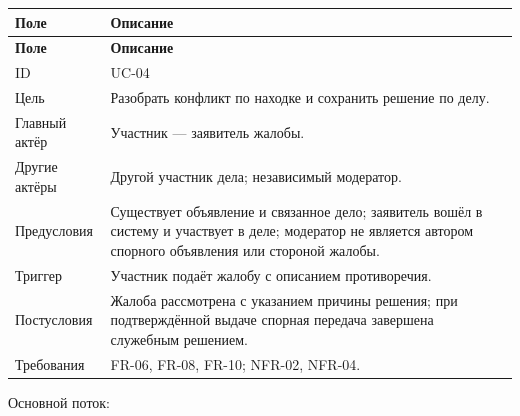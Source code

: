 \begingroup
{}
\fontsize{12}{14}\selectfont
\setlength{\tablecontentwidth}{\dimexpr\linewidth-4\tabcolsep-3\arrayrulewidth\relax}
\begin{longtable}{|>{\RaggedRight\arraybackslash}p{0.25\tablecontentwidth}|>{\RaggedRight\arraybackslash}p{0.75\tablecontentwidth}|}
\hline
\textbf{Поле} & \textbf{Описание} \\ \hline
\endfirsthead
\textbf{Поле} & \textbf{Описание} \\ \hline
\endhead
\endfoot
\endlastfoot
ID & UC-04 \\ \hline
Цель & Разобрать конфликт по находке и сохранить решение по делу. \\ \hline
Главный актёр & Участник — заявитель жалобы. \\ \hline
Другие актёры & Другой участник дела; независимый модератор. \\ \hline
Предусловия & Существует объявление и связанное дело; заявитель вошёл в систему и участвует в деле; модератор не является автором спорного объявления или стороной жалобы. \\ \hline
Триггер & Участник подаёт жалобу с описанием противоречия. \\ \hline
Постусловия & Жалоба рассмотрена с указанием причины решения; при подтверждённой выдаче спорная передача завершена служебным решением. \\ \hline
Требования & FR-06, FR-08, FR-10; NFR-02, NFR-04. \\ \hline
\end{longtable}
\endgroup

Основной поток:

